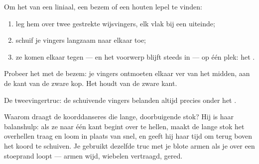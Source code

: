 \begin{method}\label{met:g2:balance-equilibrium:find}
Om het  van een liniaal, een bezem of een houten lepel te
vinden:
\begin{enumerate}
  \item leg hem over twee gestrekte wijsvingers, elk vlak bij een
        uiteinde;
  \item schuif je vingers langzaam naar elkaar toe;
  \item ze komen elkaar tegen --- en het voorwerp blijft steeds
        in  --- op één plek: het .
\end{enumerate}
Probeer het met de bezem: je vingers ontmoeten elkaar ver van het
midden, aan de kant van de zware kop. Het  houdt van de
zware kant.
\end{method}

\begin{omfigure}

{\small De tweevingertruc: de schuivende vingers belanden altijd
precies onder het .}
\end{omfigure}

\begin{example}\label{ex:g2:balance-equilibrium:acrobat}
Waarom draagt de koorddanseres die lange, doorbuigende stok? Hij is
haar balanshulp: als ze naar één kant begint over te hellen, maakt de
lange stok het overhellen traag en loom in plaats van snel, en geeft
hij haar tijd om terug boven het koord te schuiven. Je gebruikt
dezelfde truc met je blote armen als je over een stoeprand loopt ---
armen wijd, wiebelen vertraagd,  gered.
\end{example}

